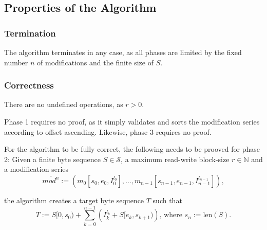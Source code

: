 \documentclass[english, 10pt, openright, twocolumn, landscape, twoside, notitlepage, a4paper, pdftex]		
{article}
\begin{document}
\subsection{Properties of the Algorithm}%
\label{sec:PROPsAlgorithmSummary}%

\subsubsection{Termination}%
\label{sec:Termination}%

The algorithm terminates in any case, as all phases are limited by the fixed number $n$ of modifications and the finite size of $S$.

\subsubsection{Correctness}%
\label{sec:Correctness}%

There are no undefined operations, as $r>0$.

Phase 1 requires no proof, as it simply validates and sorts the modification series according to offset ascending. Likewise, phase 3 requires no proof.

For the algorithm to be fully correct, the following needs to be prooved for phase 2: Given a finite byte sequence $S\in\mathcal{S}$, a maximum read-write block-size $r\in\mathbb{N}$ and a modification series 
\[\overline{mod^{n}}:=\left(m_{0}[s_{0}, e_{0}, I_{0}^{l_{0}}],\ldots,m_{n-1}[s_{n-1}, e_{n-1}, I_{n-1}^{l_{n-1}}]\right),\] 

the algorithm creates a target byte sequence $T$ such that
\[T:=S[0,s_{0})+\sum_{k=0}^{n-1}{\left(I_{k}^{l_{k}}+S[e_{k},s_{k+1})\right)}\text{, where }s_{n}:=\text{len}(S).\]
\end{document}
